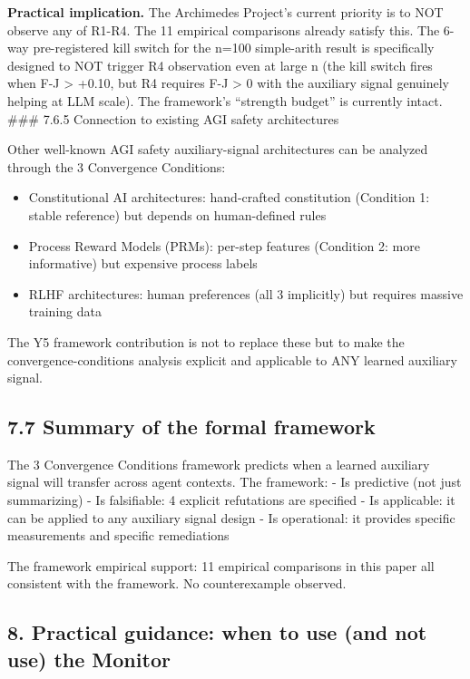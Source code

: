 \documentclass[11pt]{article}
\begin{document}
\textbf{Practical implication.} The Archimedes Project's current
priority is to NOT observe any of R1-R4. The 11 empirical comparisons
already satisfy this. The 6-way pre-registered kill switch for the n=100
simple-arith result is specifically designed to NOT trigger R4
observation even at large n (the kill switch fires when F-J
\textgreater{} +0.10, but R4 requires F-J \textgreater{} 0 with the
auxiliary signal genuinely helping at LLM scale). The framework's
``strength budget'' is currently intact. \#\#\# 7.6.5 Connection to
existing AGI safety architectures

Other well-known AGI safety auxiliary-signal architectures can be
analyzed through the 3 Convergence Conditions:

\begin{itemize}

\item
  Constitutional AI architectures: hand-crafted constitution (Condition
  1: stable reference) but depends on human-defined rules
\item
  Process Reward Models (PRMs): per-step features (Condition 2: more
  informative) but expensive process labels
\item
  RLHF architectures: human preferences (all 3 implicitly) but requires
  massive training data
\end{itemize}

The Y5 framework contribution is not to replace these but to make the
convergence-conditions analysis explicit and applicable to ANY learned
auxiliary signal.

\subsection{7.7 Summary of the formal
framework}\label{summary-of-the-formal-framework}

The 3 Convergence Conditions framework predicts when a learned auxiliary
signal will transfer across agent contexts. The framework: - Is
predictive (not just summarizing) - Is falsifiable: 4 explicit
refutations are specified - Is applicable: it can be applied to any
auxiliary signal design - Is operational: it provides specific
measurements and specific remediations

The framework empirical support: 11 empirical comparisons in this paper
all consistent with the framework. No counterexample observed.

\subsection{8. Practical guidance: when to use (and not use) the
Monitor}\label{practical-guidance-when-to-use-and-not-use-the-monitor}
\end{document}
